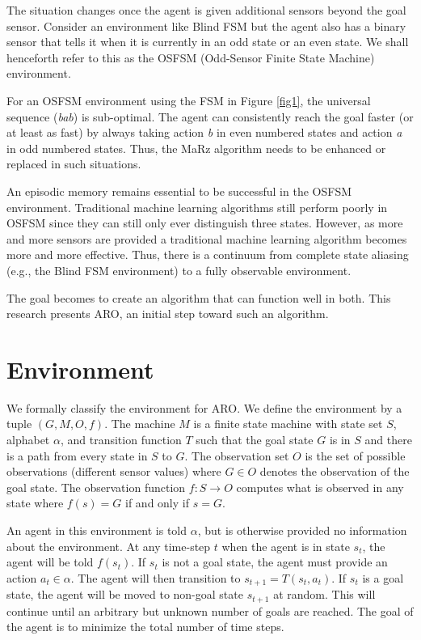 \documentclass[letterpaper]{article} %
\begin{document}

The situation changes once the agent is given additional sensors
beyond the goal sensor.  Consider an environment like Blind FSM but
the agent also has a binary sensor that tells it when it is currently
in an odd state or an even state.  We shall henceforth refer to this
as the OSFSM (Odd-Sensor Finite State Machine) environment.

For an OSFSM environment using the FSM in Figure \ref{fig1}, the
universal sequence (\textit{bab}) is sub-optimal.  The agent can
consistently reach the goal faster (or at least as fast) by always
taking action \textit{b} in even numbered states and action \textit{a}
in odd numbered states.  Thus, the MaRz algorithm needs to be enhanced
or replaced in such situations.

An episodic memory remains essential to be successful in the OSFSM
environment.  Traditional machine learning algorithms still perform
poorly in OSFSM since they can still only ever distinguish three
states.  However, as more and more sensors are provided a traditional
machine learning algorithm becomes more and more effective.  Thus,
there is a continuum from complete state aliasing (e.g., the Blind FSM
environment) to a fully observable environment.

The goal becomes to create an algorithm that can function well in
both.  This research presents ARO, an initial step toward such an
algorithm.

\section{Environment}

We formally classify the environment for ARO. We define the environment by a tuple $(G, M, O, f)$. The machine $M$ is a finite state machine with state set $S$, alphabet $\alpha$, and transition function $T$ such that the goal state $G$ is in $S$ and there is a path from every state in $S$ to $G$. The observation set $O$ is the set of possible observations (different sensor values) where $G \in O$ denotes the observation of the goal state. The observation function $f: S \rightarrow O$ computes what is observed in any state where $f(s) = G$ if and only if $s = G$. 

An agent in this environment is told $\alpha$, but is otherwise provided no information about the environment. At any time-step $t$ when the agent is in state $s_t$, the agent will be told $f(s_t)$. If $s_t$ is not a goal state, the agent must provide an action $a_t \in \alpha$. The agent will then transition to $s_{t+1} = T(s_t, a_t)$. If $s_t$ is a goal state, the agent will be moved to non-goal state $s_{t+1}$ at random. This will continue until an arbitrary but unknown number of goals are reached. The goal of the agent is to minimize the total number of time steps.
\end{document}
